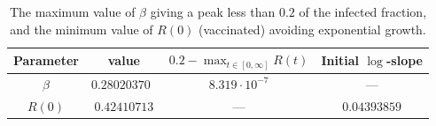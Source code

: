 \begin{table}[htb]
	\centering
	\caption{The maximum value of $\beta$ giving a peak less than $0.2$ of the infected fraction, and the minimum value of $R(0)$ (vaccinated) avoiding exponential growth.}
	\begin{tabular}{cccc}
		\toprule
		Parameter & value & $0.2 - \max_{t\in[0,\infty]} R(t)$ & Initial $\log$-slope \\
		\midrule
		$\beta$ & $0.28020370$ & $8.319\cdot 10^{-7}$ & --- \\
		$R(0)$  & $0.42410713$ & --- & $0.04393859$ \\
		\bottomrule
	\end{tabular}
\end{table}


